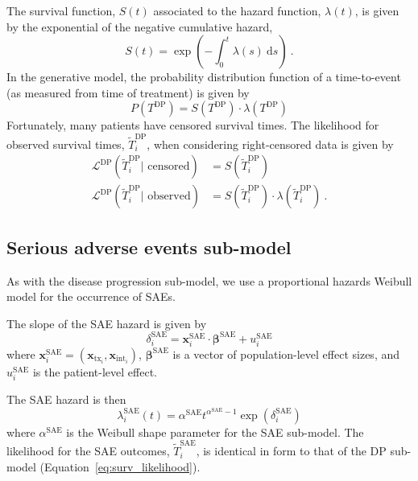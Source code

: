 \documentclass[twocolumn]{bmcart}%
\def\v#1{\bm{#1}}
\newcommand{\like}{\ensuremath{\mathcal{L}}}
\newcommand{\sae}{\ensuremath{\text{SAE}}}
\newcommand{\prog}{\ensuremath{\text{DP}}}
\begin{document}
The survival function, $S(t)$ associated to the hazard function, $\lambda(t)$, is given by the exponential of the negative cumulative hazard,
\begin{equation}
  \label{eq:survival}
  S(t) = \exp\left(-\int_0^t \lambda(s) \ \mathrm{d}s \right) \ .
\end{equation}
In the generative model, the probability distribution function of a time-to-event (as measured from time of treatment) is given by
\begin{equation}
  \label{eq:surv_generative}
  P(T^\prog) = S(T^\prog) \cdot \lambda(T^\prog)
\end{equation}
Fortunately, many patients have censored survival times.
The likelihood for observed survival times, $\tilde{T}_i^\prog$, when considering right-censored data is given by
\begin{align}
  \label{eq:surv_likelihood}
  \like^\prog(\tilde{T}_i^\prog | \text{ censored}) &= S(\tilde{T}_i^\prog) \\
  \like^\prog(\tilde{T}_i^\prog | \text{ observed}) &= S(\tilde{T}_i^\prog) \cdot \lambda(\tilde{T}_i^\prog) \ . \nonumber
\end{align}

\subsection{Serious adverse events sub-model}\label{sec:model-sae}

As with the disease progression sub-model, we use a proportional hazards Weibull model for the occurrence of SAEs.

The slope of the SAE hazard is given by
\begin{equation}
  \label{eq:sae_slope}
  \delta_i^\sae = \v x_i^\sae \cdot \v \beta^\sae + u_i^\sae
\end{equation}
where $\v x_i^\sae = (\v x_{\text{tx}_i}, \v x_{\text{int}_i})$, $\v \beta^\sae$ is a vector of population-level effect sizes, and $u_i^\sae$ is the patient-level effect.

The SAE hazard is then
\begin{equation}
  \label{eq:sae_hazard}
  \lambda_i^\sae(t) = \alpha^\sae t^{\alpha^\sae - 1} \exp(\delta_i^\sae)
\end{equation}
where $\alpha^\sae$ is the Weibull shape parameter for the SAE sub-model.
The likelihood for the SAE outcomes, $\tilde{T}_i^\sae$, is identical in form to that of the DP sub-model (Equation~\ref{eq:surv_likelihood}).
\end{document}

